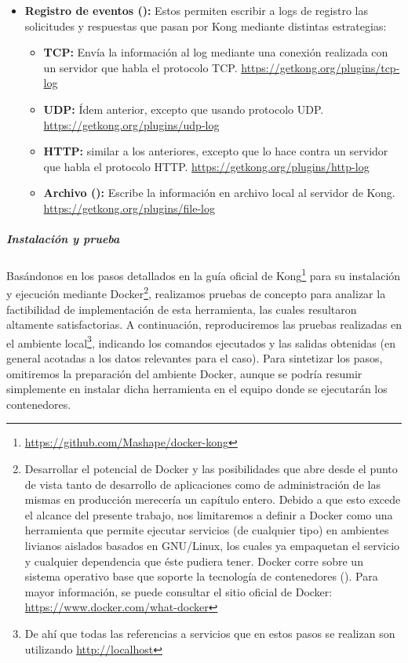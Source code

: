 \begin{itemize}
  \item \textbf{Registro de eventos ():} Estos  permiten escribir a logs de registro las solicitudes y respuestas que pasan por Kong mediante distintas estrategias:
  \begin{itemize}
    \item \textbf{TCP:} Envía la información al log mediante una conexión realizada con un servidor que habla el protocolo TCP. \url{https://getkong.org/plugins/tcp-log}
    \item \textbf{UDP:} Ídem anterior, excepto que usando protocolo UDP. \url{https://getkong.org/plugins/udp-log}
    \item \textbf{HTTP:}  similar a los anteriores, excepto que lo hace contra un servidor que habla el protocolo HTTP. \url{https://getkong.org/plugins/http-log}
    \item \textbf{Archivo ():} Escribe la información en archivo local al servidor de Kong. \url{https://getkong.org/plugins/file-log}
  \end{itemize}
\end{itemize}

\subparagraph{Instalación y prueba}

Basándonos en los pasos detallados en la guía oficial de Kong\footnote{\url{https://github.com/Mashape/docker-kong}} para su instalación y ejecución mediante Docker\footnote{Desarrollar el potencial de Docker y las posibilidades que abre desde el punto de vista tanto de desarrollo de aplicaciones como de administración de las mismas en producción merecería un capítulo entero. Debido a que esto excede el alcance del presente trabajo, nos limitaremos a definir a Docker como una herramienta que permite ejecutar servicios (de cualquier tipo) en ambientes livianos aislados basados en GNU/Linux, los cuales ya empaquetan el servicio y cualquier dependencia que éste pudiera tener. Docker corre sobre un sistema operativo base que soporte la tecnología de contenedores (). Para mayor información, se puede consultar el sitio oficial de Docker: \url{https://www.docker.com/what-docker}}, realizamos pruebas de concepto para analizar la factibilidad de implementación de esta herramienta, las cuales resultaron altamente satisfactorias. A continuación, reproduciremos las pruebas realizadas en el ambiente local\footnote{De ahí que todas las referencias a servicios que en estos pasos se realizan son utilizando \url{http://localhost}}, indicando los comandos ejecutados y las salidas obtenidas (en general acotadas a los datos relevantes para el caso). Para sintetizar los pasos, omitiremos la preparación del ambiente Docker, aunque se podría resumir simplemente en instalar dicha herramienta en el equipo donde se ejecutarán los contenedores.

